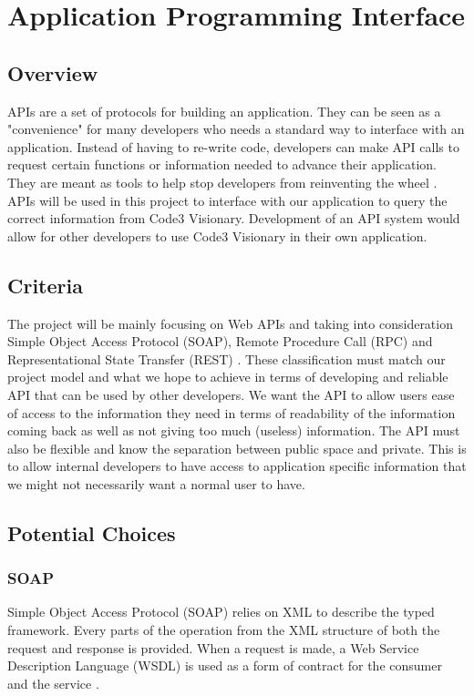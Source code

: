 \documentclass[10pt, onecolumn, draftclsnofoot, letterpaper, compsoc]{IEEEtran}
\begin{document}
\section{Application Programming Interface}

\subsection{Overview}
APIs are a set of protocols for building an application.
They can be seen as a "convenience" for many developers who needs a standard way to interface with an application.
Instead of having to re-write code, developers can make API calls to request certain functions or information needed to advance their application.
They are meant as tools to help stop developers from reinventing the wheel \cite{apibasic}.
APIs will be used in this project to interface with our application to query the correct information from Code3 Visionary.
Development of an API system would allow for other developers to use Code3 Visionary in their own application.

\subsection{Criteria}
The project will be mainly focusing on Web APIs and taking into consideration Simple Object Access Protocol (SOAP), Remote Procedure Call (RPC) and Representational State Transfer (REST) \cite{typesapi}.
These classification must match our project model and what we hope to achieve in terms of developing and reliable API that can be used by other developers.
We want the API to allow users ease of access to the information they need in terms of readability of the information coming back as well as not giving too much (useless) information.
The API must also be flexible and know the separation between public space and private.
This is to allow internal developers to have access to application specific information that we might not necessarily want a normal user to have. 

\subsection{Potential Choices}
    \subsubsection{SOAP}
    Simple Object Access Protocol (SOAP) relies on XML to describe the typed framework. 
    Every parts of the operation from the XML structure of both the request and response is provided.
    When a request is made, a Web Service Description Language (WSDL) is used as a form of contract for the consumer and the service \cite{SOAPvsREST}.
    
\end{document}
